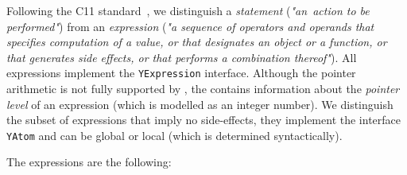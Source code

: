 Following the C11 standard~\cite{c11}, we distinguish a \textit{statement} (\textit{"an~action to be performed"}) from an \textit{expression} (\textit{"a sequence of operators and operands that specifies computation of a value, or that designates an object or a function, or that generates side effects, or that performs a combination thereof"}).
All \ytree{} expressions implement the \texttt{YExpression} interface.
Although the pointer arithmetic is not fully supported by \porthos[2], the \ytree{} contains information about the \textit{pointer level} of an expression (which is modelled as an integer number). 
We distinguish the subset of expressions that imply no side-effects, they implement the interface \texttt{YAtom} and can be global or local (which is determined syntactically).

\vspace{1em}
The \ytree{} expressions are the following:


